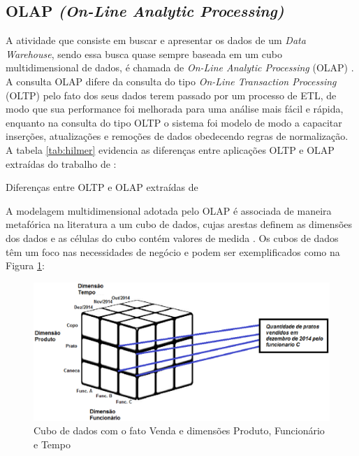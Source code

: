 \subsection{OLAP \textit{(On-Line Analytic Processing)}}

A atividade que consiste em buscar e apresentar os dados de um \textit{Data Warehouse}, sendo essa busca quase sempre baseada em um cubo multidimensional de dados, é chamada de \textit{On-Line Analytic Processing} (OLAP) \cite{Kimball2002}. A consulta OLAP difere da consulta do tipo \textit{On-Line Transaction Processing} (OLTP) pelo fato dos seus dados terem passado por um processo de ETL, de modo que sua performance foi melhorada para uma análise mais fácil e rápida, enquanto na consulta do tipo OLTP o sistema foi modelo de modo a capacitar inserções, atualizações e remoções de dados obedecendo regras de normalização. A tabela \ref{tab:hilmer} evidencia as diferenças entre aplicações OLTP e OLAP extraídas do trabalho de : 

\begin{table}[!ht]
	\begin{center}
	
	 
	\caption{Diferenças entre OLTP e OLAP extraídas de }
	\label{tab:hilmer}
	\end{center}
	\end{table}	
	\FloatBarrier	

A modelagem multidimensional adotada pelo OLAP é associada de maneira metafórica na literatura a um cubo de dados, cujas arestas definem as dimensões dos dados e as células do cubo contém valores de medida \cite{Kimball2002}. Os cubos de dados têm um foco nas necessidades de negócio e podem ser exemplificados como na Figura \ref{fig:cubo}:

\begin{figure}[h!]
\centering
\includegraphics[keepaspectratio=false,scale=0.50]{figuras/figuras_matheus/cubo.eps}
\caption{Cubo de dados com o fato Venda e dimensões Produto, Funcionário e Tempo}
\label{fig:cubo}
\end{figure}
\FloatBarrier

